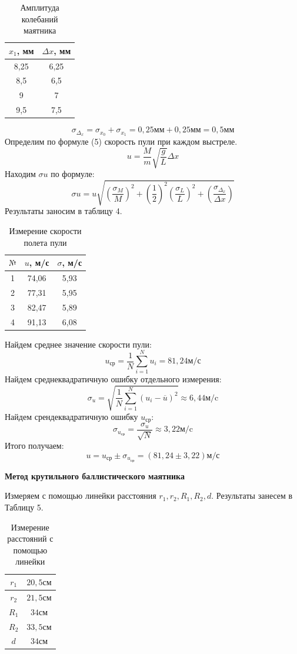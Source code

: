 \documentclass[a4paper,12pt]{article} %
\begin{document}
\begin{table}[h]
\caption{Амплитуда колебаний маятника}
\centering
\begin{tabular}{|c|c|}
\hline
$x_1$, мм & $\Delta x$, мм \\ \hline
8,25 & 6,25 \\ \hline
8,5 & 6,5\\ \hline
9 & 7\\ \hline
9,5 & 7,5\\ \hline
\end{tabular}
\end{table}
\[\sigma_{\Delta_x} = \sigma_{x_0} + \sigma_{x_1} = 0,25\text{мм}+0,25\text{мм} = 0,5\text{мм}\]
Определим по формуле (5) скорость пули при каждом выстреле.\[u = \frac{M}{m}\sqrt{\frac{g}{L}}\Delta x\] Находим $\sigma u$ по формуле:
\[\sigma u = u\sqrt{\left(\frac{\sigma_M}{M}\right)^2+\left(\frac{1}{2}\right)^2\left(\frac{\sigma_L}{L}\right)^2+\left(\frac{\sigma_{\Delta_x}}{\Delta x}\right)}\]
Результаты заносим в таблицу 4.


\begin{table}[h]
\centering
\caption{Измерение скорости полета пули}
\begin{tabular}{|c|c|c|}
\hline
$\text{№}$ & $u$, м/с & $\sigma$, м/с \\ \hline
1 & 74,06 & 5,93\\ \hline
2 & 77,31& 5,95\\ \hline
3& 82,47& 5,89\\ \hline
4 & 91,13& 6,08\\ \hline
\end{tabular}
\end{table}
Найдем среднее значение скорости пули:
\[u_\text{ср} = \frac{1}{N}\sum_{i=1}^{N}u_i = 81,24\text{м/с}\]
Найдем среднеквадратичную ошибку отдельного измерения:
\[\sigma_u = \sqrt{\frac{1}{N}\sum_{i=1}^N(u_i-\overline{u})^2} \approx 6,44\text{м/c}\]
Найдем срендеквадратичную ошибку ${u_\text{ср}}$:
\[\sigma_{u_\text{ср}} = \frac{\sigma_u}{\sqrt{N}}\approx 3,22\text{м/c}\]
Итого получаем:
\[u = u_\text{ср}\pm\sigma_{u_\text{ср}} = (81,24\pm3,22)\text{м/с}\]

\textbf{Метод крутильного баллистического маятника}

Измеряем с помощью линейки расстояния $r_1, r_2, R_1, R_2, d$. Результаты занесем в Таблицу 5.
\begin{table}[h]
\centering
\caption{Измерение расстояний с помощью линейки}
\begin{tabular}{|c|c|}
\hline
$r_1$ & $20,5\text{см}$ \\ \hline
$r_2$& $21,5\text{см}$\\ \hline
$R_1$ & $34\text{см}$\\ \hline
$R_2$& $33,5\text{см}$\\ \hline
$d$ & $34\text{см}$\\ \hline
\end{tabular}
\end{table}
\end{document}
